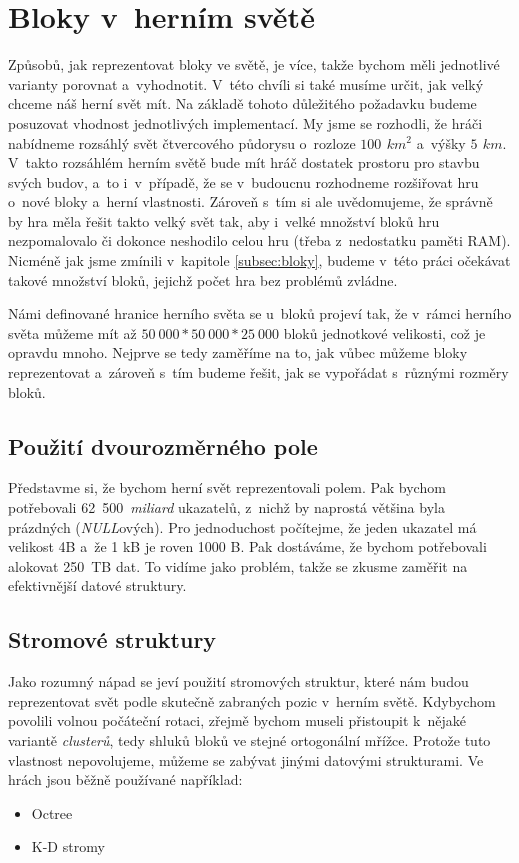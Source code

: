 \section{Bloky v~herním světě}
\label{sec:blocksWorld}

Způsobů, jak reprezentovat bloky ve světě, je více, takže bychom měli jednotlivé varianty porovnat a~vyhodnotit. V~této chvíli si také musíme určit, jak velký chceme náš herní svět mít. Na základě tohoto důležitého požadavku budeme posuzovat vhodnost jednotlivých implementací. My jsme se rozhodli, že hráči nabídneme rozsáhlý svět čtvercového půdorysu o~rozloze $100\,\ km^2$ a~výšky $5\,\ km$. V~takto rozsáhlém herním světě bude mít hráč dostatek prostoru pro stavbu svých budov, a~to i~v~případě, že se v~budoucnu rozhodneme rozšiřovat hru o~nové bloky a~herní vlastnosti. Zároveň s~tím si ale uvědomujeme, že správně by hra měla řešit takto velký svět tak, aby i~velké množství bloků hru nezpomalovalo či dokonce neshodilo celou hru (třeba z~nedostatku paměti RAM). Nicméně jak jsme zmínili v~kapitole \ref{subsec:bloky}, budeme v~této práci očekávat takové množství bloků, jejichž počet hra bez problémů zvládne.

Námi definované hranice herního světa se u~bloků projeví tak, že v~rámci herního světa můžeme mít až $50~000 * 50~000 * 25~000$ bloků jednotkové velikosti, což je opravdu mnoho. Nejprve se tedy zaměříme na to, jak vůbec můžeme bloky reprezentovat a~zároveň s~tím budeme řešit, jak se vypořádat s~různými rozměry bloků.

\subsection{Použití dvourozměrného pole}

Představme si, že bychom herní svět reprezentovali polem. Pak bychom potřebovali 62~500~\textit{miliard} ukazatelů, z~nichž by naprostá většina byla prázdných (\textit{NULL}ových). Pro jednoduchost počítejme, že jeden ukazatel má velikost 4B a~že 1 kB je roven 1000 B. Pak dostáváme, že bychom potřebovali alokovat 250~TB dat. To vidíme jako problém, takže se zkusme zaměřit na efektivnější datové struktury.

\subsection{Stromové struktury}
\label{subsec:trees}

Jako rozumný nápad se jeví použití stromových struktur, které nám budou reprezentovat svět podle skutečně zabraných pozic v~herním světě. Kdybychom povolili volnou počáteční rotaci, zřejmě bychom museli přistoupit k~nějaké variantě \textit{clusterů}, tedy shluků bloků ve stejné ortogonální mřížce. Protože tuto vlastnost nepovolujeme, můžeme se zabývat jinými datovými strukturami. Ve hrách jsou běžně používané například:
\pagebreak
\begin{itemize}
	\item Octree
	\item K-D stromy
\end{itemize}

